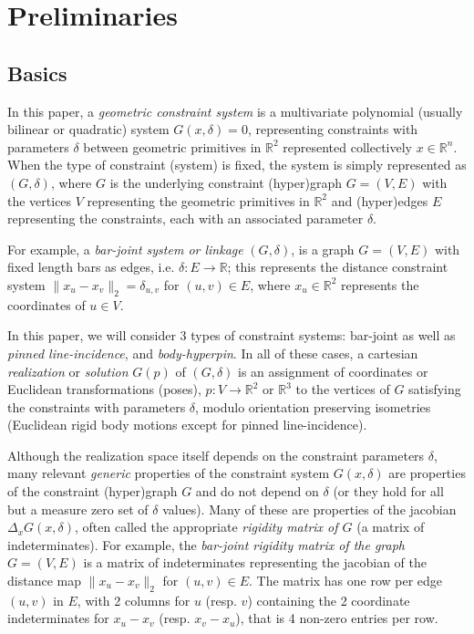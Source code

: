 \section{Preliminaries}
\label{sec:prelim}

\subsection{Basics}



In this paper, a {\em geometric constraint system} is a multivariate 
polynomial (usually bilinear or quadratic) system
$G(x,\delta)=0$, representing constraints with parameters $\delta$ 
between geometric primitives  in $\mathbb{R}^2$ represented collectively $x\in \mathbb{R}^n$.   
%
When the type of constraint (system) is fixed, 
the system is simply represented as $(G,\delta)$, where 
$G$ is the underlying constraint (hyper)graph $G = (V,E)$ 
with the vertices $V$ representing the geometric primitives in 
$\mathbb{R}^2$ and (hyper)edges
$E$ representing the constraints, each with an associated 
parameter $\delta$.

For example, a {\em bar-joint system or linkage} $(G,\delta)$, is a graph
$G=(V,E)$  
with fixed length bars as edges, i.e. $\delta: E \rightarrow \mathbb{R}$;
this represents the distance constraint system $\| x_u -x_v \|_2 =
\delta_{u,v}$ for  $(u,v) \in E$, where $x_u \in \mathbb{R}^2$ represents the coordinates of
$u\in V$. 

In this paper, we will consider 3 types of constraint systems: bar-joint
as well as {\em pinned line-incidence}, and {\em body-hyperpin}. 
In all of these cases, a cartesian \emph{realization} or 
\emph{solution} $G(p)$ of $(G,\delta)$ is 
an assignment of coordinates or Euclidean transformations (poses), 
$p: V \rightarrow
\mathbb{R}^2$ or $\mathbb{R}^3$ to the vertices of $G$ satisfying the 
constraints with parameters $\delta$, 
modulo orientation preserving isometries 
(Euclidean rigid body motions except for pinned line-incidence). 

Although the realization space itself depends on the constraint parameters 
$\delta$, many  relevant {\em generic} properties of 
the constraint system $G(x,\delta)$
are properties of the constraint (hyper)graph $G$ 
and do not depend on $\delta$ (or they hold for all but a measure 
zero set of $\delta$
values). Many of these are properties of the jacobian 
$\Delta_x G(x,\delta)$, often called the appropriate {\em rigidity matrix of
$G$} 
(a matrix of indeterminates).
For example, the {\em bar-joint rigidity matrix 
of the graph $G = (V,E)$}
is a matrix of indeterminates representing the 
jacobian of the distance map 
$\| x_u -x_v \|_2$  for $(u,v) \in E$.
The matrix has one row per edge $(u,v)$ in $E$,  
with 2 columns for $u$ (resp.
$v$) containing the 2 coordinate indeterminates 
for $x_u -x_v$ (resp. $x_v-x_u$), 
that is 4 non-zero entries per row. 

